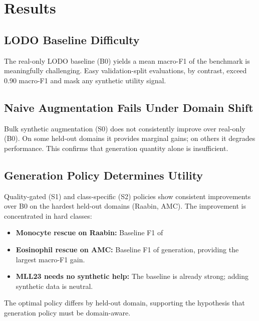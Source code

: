 \documentclass[10pt,twocolumn]{article}
\begin{document}
\section{Results}
\label{sec:results}

\subsection{LODO Baseline Difficulty}

The real-only LODO baseline (B0) yields a mean macro-F1 of
the benchmark is meaningfully challenging. Easy validation-split
evaluations, by contrast, exceed 0.90 macro-F1 and mask any synthetic
utility signal.

\subsection{Naive Augmentation Fails Under Domain Shift}

Bulk synthetic augmentation (S0) does not consistently improve over
real-only (B0). On some held-out domains it provides marginal gains; on
others it degrades performance. This confirms that generation quantity
alone is insufficient.

\subsection{Generation Policy Determines Utility}

Quality-gated (S1) and class-specific (S2) policies show consistent
improvements over B0 on the hardest held-out domains (Raabin, AMC).
The improvement is concentrated in hard classes:

\begin{itemize}[leftmargin=*,nosep]
\item \textbf{Monocyte rescue on Raabin:} Baseline F1 of
\item \textbf{Eosinophil rescue on AMC:} Baseline F1 of
  generation, providing the largest macro-F1 gain.
\item \textbf{MLL23 needs no synthetic help:} The baseline is already
  strong; adding synthetic data is neutral.
\end{itemize}

The optimal policy differs by held-out domain, supporting the hypothesis
that generation policy must be domain-aware.
\end{document}
